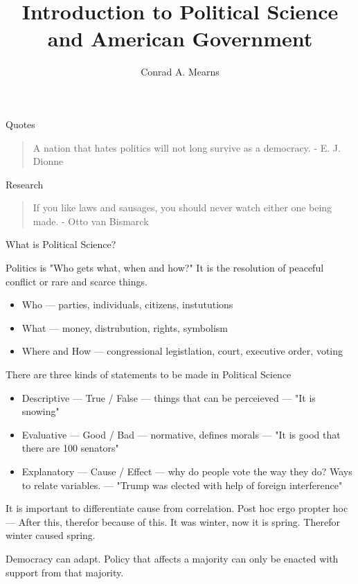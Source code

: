 \documentclass{article}
\title{Introduction to Political Science and American Government}
\author{Conrad A. Mearns}
\begin{document}
\maketitle

\noindent
\Large Quotes\\
\normalsize
\begin{quote}
  A nation that hates politics will not long survive as a democracy. - E. J. Dionne
\end{quote}

Research

\begin{quote}
  If you like laws and sausages, you should never watch either one being made. - Otto van Bismarck
\end{quote}

\noindent
\Large
What is Political Science?\\
\normalsize

\noindent
Politics is "Who gets what, when and how?" It is the resolution of peaceful conflict or rare and scarce things.
\begin{itemize}
  \item Who --- parties, individuals, citizens, instututions
  \item What --- money, distrubution, rights, symbolism
  \item Where and How --- congressional legistlation, court, executive order, voting
\end{itemize}

\noindent
There are three kinds of statements to be made in Political Science
\begin{itemize}
  \item Descriptive --- True / False --- things that can be perceieved --- "It is snowing"
  \item Evaluative --- Good / Bad --- normative, defines morals --- "It is good that there are 100 senators"
  \item Explanatory --- Cause / Effect --- why do people vote the way they do? Ways to relate variables. --- "Trump was elected with help of foreign interference"
\end{itemize}

\noindent
It is important to differentiate cause from correlation. Post hoc ergo propter hoc --- After this, therefor because of this. It was winter, now it is spring. Therefor winter caused spring.

\noindent
Democracy can adapt. Policy that affects a majority can only be enacted with support from that majority.\\
\end{document}
